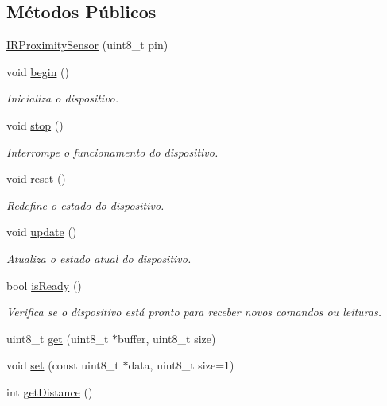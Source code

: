 \subsection*{Métodos Públicos}
\begin{DoxyCompactItemize}
\item 
\hyperlink{classIRProximitySensor_a8a69e6f2fd9489e3d06be8421dd2d541}{I\-R\-Proximity\-Sensor} (uint8\-\_\-t pin)
\item 
void \hyperlink{classIRProximitySensor_a84d9a5c841ffd21273762a04d791eb5a}{begin} ()
\begin{DoxyCompactList}\small\item\em Inicializa o dispositivo. \end{DoxyCompactList}\item 
void \hyperlink{classIRProximitySensor_a796e2f4d29f59393d25de6b3b7e0f70b}{stop} ()
\begin{DoxyCompactList}\small\item\em Interrompe o funcionamento do dispositivo. \end{DoxyCompactList}\item 
void \hyperlink{classIRProximitySensor_aca3e197dd2cce038658bb381ad8a2d97}{reset} ()
\begin{DoxyCompactList}\small\item\em Redefine o estado do dispositivo. \end{DoxyCompactList}\item 
void \hyperlink{classIRProximitySensor_a2e18942667a104cc3aae96dc5724097e}{update} ()
\begin{DoxyCompactList}\small\item\em Atualiza o estado atual do dispositivo. \end{DoxyCompactList}\item 
bool \hyperlink{classIRProximitySensor_a4b3faeccd653b259b513a9326c52c8dd}{is\-Ready} ()
\begin{DoxyCompactList}\small\item\em Verifica se o dispositivo está pronto para receber novos comandos ou leituras. \end{DoxyCompactList}\item 
uint8\-\_\-t \hyperlink{classIRProximitySensor_a7137ed31e794212c00e866af8c79b773}{get} (uint8\-\_\-t $\ast$buffer, uint8\-\_\-t size)
\item 
void \hyperlink{classIRProximitySensor_afbbfaa05fc2a2bca5b3877f99e6b0a4f}{set} (const uint8\-\_\-t $\ast$data, uint8\-\_\-t size=1)
\item 
int \hyperlink{classIRProximitySensor_ab9bdeff4396b6a28bb2e1717e4f3f96e}{get\-Distance} ()
\end{DoxyCompactItemize}


